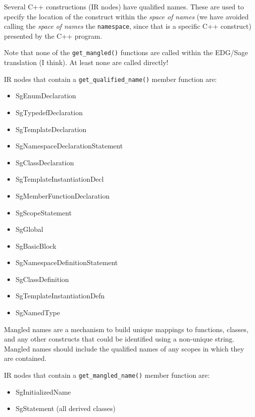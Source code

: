      Several C++ constructions (IR nodes) have qualified names.  These
are used to specify the location of the construct within the {\em space of names}
(we have avoided calling the {\em space of names} the {\tt namespace}, since that
is a specific C++ construct) presented by the C++ program.

     Note that none of the {\tt get\_mangled()} functions are called within the EDG/Sage 
translation (I think).  At least none are called directly!

   IR nodes that contain a {\tt get\_qualified\_name()} member function are:
\begin{itemize}
     \item SgEnumDeclaration
     \item SgTypedefDeclaration
     \item SgTemplateDeclaration
     \item SgNamespaceDeclarationStatement
     \item SgClassDeclaration
     \item SgTemplateInstantiationDecl
     \item SgMemberFunctionDeclaration
     \item SgScopeStatement
     \item SgGlobal
     \item SgBasicBlock
     \item SgNamespaceDefinitionStatement
     \item SgClassDefinition
     \item SgTemplateInstantiationDefn
     \item SgNamedType
\end{itemize}

   Mangled names are a mechanism to build unique mappings to functions, classes,
and any other constructs that could be identified using a non-unique string.
Mangled names should include the qualified names of any scopes in which they
are contained.

   IR nodes that contain a {\tt get\_mangled\_name()} member function are:
\begin{itemize}
     \item SgInitializedName
     \item SgStatement (all derived classes)
\end{itemize}


